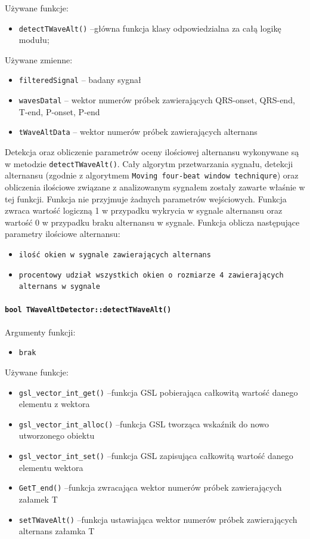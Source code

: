\documentclass[a4paper, 11pt]{article}
\begin{document}
Używane funkcje:
\begin{itemize}
\item \verb+detectTWaveAlt()+ --główna funkcja klasy odpowiedzialna za całą logikę modułu;
\end{itemize}

\medskip{}

Używane zmienne:
\begin{itemize}
\item \verb+filteredSignal+ --  badany sygnał
\item \verb+wavesDatal+ -- wektor numerów próbek zawierających QRS-onset, QRS-end, T-end, P-onset, P-end
\item \verb+tWaveAltData+ -- wektor numerów próbek zawierających alternans
\end{itemize}


\medskip{}

Detekcja oraz obliczenie parametrów oceny ilościowej alternansu wykonywane są w metodzie  \verb|detectTWaveAlt()|. Cały algorytm przetwarzania sygnału, detekcji alternansu (zgodnie z algorytmem  \verb|Moving four-beat window techniqure|) oraz obliczenia ilościowe związane z analizowanym sygnałem zostały zawarte właśnie w tej funkcji. Funkcja nie przyjmuje żadnych parametrów wejściowych. Funkcja zwraca wartość logiczną 1 w przypadku wykrycia w sygnale alternansu oraz wartość 0 w przypadku braku alternansu w sygnale. Funkcja oblicza następujące parametry ilościowe alternansu:
\begin{itemize}
\item \verb+ilość okien w sygnale zawierających alternans+
\item \verb+procentowy udział wszystkich okien o rozmiarze 4 zawierających alternans w sygnale+
\end{itemize}


\paragraph{\texttt{bool TWaveAltDetector::detectTWaveAlt()}}

\medskip{}

Argumenty funkcji:

\begin{itemize}
\item \verb+brak+
\end{itemize}
\medskip{}

Używane funkcje:
\begin{itemize}
\item \verb+gsl_vector_int_get()+ --funkcja GSL pobierająca całkowitą wartość danego elementu z wektora
\item \verb+gsl_vector_int_alloc()+ --funkcja GSL tworząca wskaźnik do nowo utworzonego obiektu 
\item \verb+gsl_vector_int_set()+ --funkcja GSL zapisująca całkowitą wartość danego elementu wektora
\item \verb+GetT_end()+ --funkcja zwracająca wektor numerów próbek zawierających załamek T
\item \verb+setTWaveAlt()+ --funkcja ustawiająca wektor numerów próbek zawierających alternans załamka T
\end{itemize}
\end{document}
